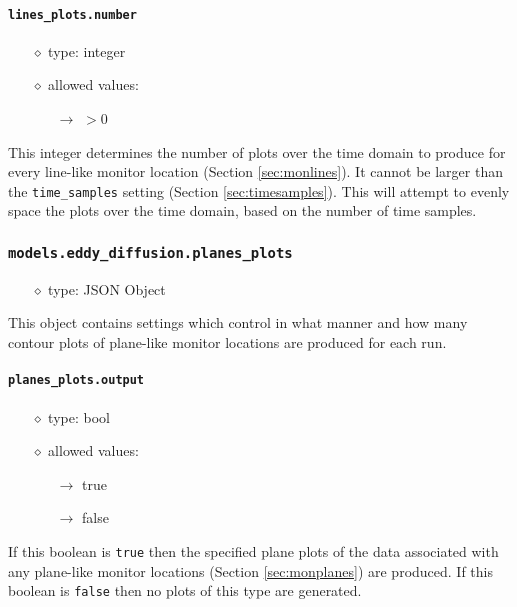 \documentclass[]{article}
\def\code#1{\texttt{#1}}
\begin{document}
\paragraph{\code{lines\_plots.number}}
\begin{itemize}
    \item[$\diamond$] type: integer 
    \item[$\diamond$] allowed values:
    \begin{itemize}
        \item[$\rightarrow$] $>0$
    \end{itemize}
\end{itemize}
This integer determines the number of plots over the time domain to produce for
every line-like monitor location (Section \ref{sec:monlines}). It cannot be
larger than the \code{time\_samples} setting (Section \ref{sec:timesamples}).
This will attempt to evenly space the plots over the time domain, based on the
number of time samples.


\subsubsection{\code{models.eddy\_diffusion.planes\_plots}}
\begin{itemize}
    \item[$\diamond$] type: JSON Object 
\end{itemize}
This object contains settings which control in what manner and how many contour 
plots of plane-like monitor locations are produced for each run. 

\paragraph{\code{planes\_plots.output}}
\begin{itemize}
    \item[$\diamond$] type: bool 
    \item[$\diamond$] allowed values:
    \begin{itemize}
        \item[$\rightarrow$] true
        \item[$\rightarrow$] false
    \end{itemize}
\end{itemize}
If this boolean is \code{true} then the specified plane plots of the data
associated with any plane-like monitor locations (Section \ref{sec:monplanes}) are
produced.  If this boolean is \code{false} then no plots of this type are
generated.
\end{document}
